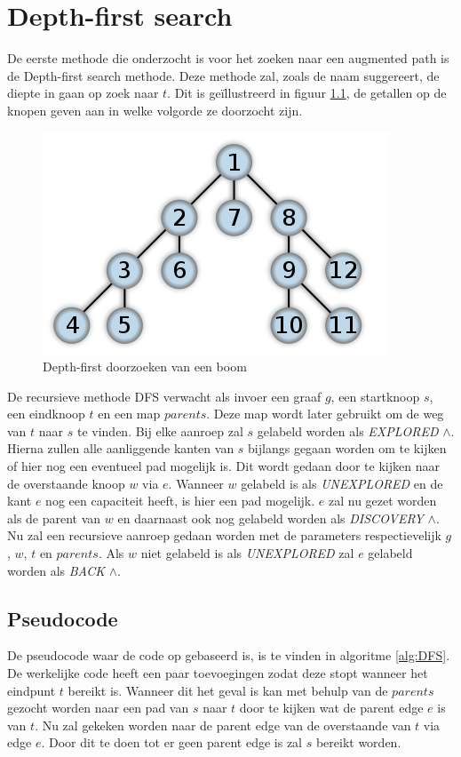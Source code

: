 \chapter{Depth-first search}
\label{chap:depthfirst}

De eerste methode die onderzocht is voor het zoeken naar een augmented path is de Depth-first search methode. Deze methode zal, zoals de naam suggereert, de diepte in gaan op zoek naar $t$. Dit is ge\"illustreerd in figuur \ref{fig:depthFirstTree}, de getallen op de knopen geven aan in welke volgorde ze doorzocht zijn.

\begin{figure}[h]
 \centering
 \includegraphics[width=0.5\linewidth]{depthfirst/depthfirsttree}
 \caption{Depth-first doorzoeken van een boom}
 \label{fig:depthFirstTree}
\end{figure}

De recursieve methode DFS verwacht als invoer een graaf $g$, een startknoop $s$, een eindknoop $t$ en een map $parents$. Deze map wordt later gebruikt om de weg van $t$ naar $s$ te vinden. Bij elke aanroep zal $s$ gelabeld worden als \textit{EXPLORED} $\land$. Hierna zullen alle aanliggende kanten van $s$ bijlangs gegaan worden om te kijken of hier nog een eventueel pad mogelijk is. Dit wordt gedaan door te kijken naar de overstaande knoop $w$ via $e$. Wanneer $w$ gelabeld is als \textit{UNEXPLORED} en de kant $e$ nog een capaciteit heeft, is hier een pad mogelijk. $e$ zal nu gezet worden als de parent van $w$ en daarnaast ook nog gelabeld worden als \textit{DISCOVERY} $\land$. Nu zal een recursieve aanroep gedaan worden met de parameters respectievelijk $g$, $w$, $t$ en $parents$.
Als $w$ niet gelabeld is als \textit{UNEXPLORED} zal $e$ gelabeld worden als \textit{BACK} $\land$.

\section{Pseudocode}
De pseudocode waar de code op gebaseerd is, is te vinden in algoritme \ref{alg:DFS}. De werkelijke code heeft een paar toevoegingen zodat deze stopt wanneer het eindpunt $t$ bereikt is. Wanneer dit het geval is kan met behulp van de $parents$ gezocht worden naar een pad van $s$ naar $t$ door te kijken wat de parent edge $e$ is van $t$. Nu zal gekeken worden naar de parent edge van de overstaande van $t$ via edge $e$. Door dit te doen tot er geen parent edge is zal $s$ bereikt worden.

